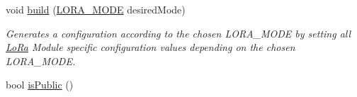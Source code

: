 \begin{DoxyCompactItemize}
\item 
void \hyperlink{class_lo_ra_config_a82652fe8fa6ce800ab5cb712d21cdd01}{build} (\hyperlink{_lo_ra_config_8h_a07be112bb46983585d462a9039dc470c}{L\+O\+R\+A\+\_\+\+M\+O\+D\+E} desired\+Mode)
\begin{DoxyCompactList}\small\item\em Generates a configuration according to the chosen L\+O\+R\+A\+\_\+\+M\+O\+D\+E by setting all \hyperlink{class_lo_ra}{Lo\+Ra} Module specific configuration values depending on the chosen L\+O\+R\+A\+\_\+\+M\+O\+D\+E. \end{DoxyCompactList}\item 
\hypertarget{class_lo_ra_config_a48eb30816989f3655bc1408ce93202b6}{}bool \hyperlink{class_lo_ra_config_a48eb30816989f3655bc1408ce93202b6}{is\+Public} ()\label{class_lo_ra_config_a48eb30816989f3655bc1408ce93202b6}


\end{DoxyCompactItemize}

